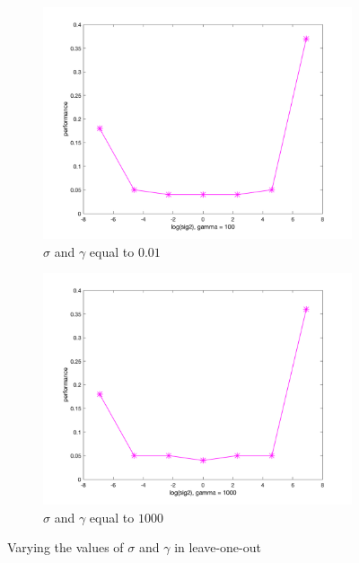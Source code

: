 \documentclass[a4paper, 11pt, one column]{article}
\begin{document}
\begin{figure}[]
\begin{subfigure}{0.33\linewidth}
            \includegraphics[width=\linewidth]{images/loo_sig2_g_100.png}
            \caption{$\sigma$ and $\gamma$ equal to $0.01$}
        \end{subfigure}
        \begin{subfigure}{0.33\linewidth}
            \includegraphics[width=\linewidth]{images/loo_sig2_g_1000.png}
            \caption{$\sigma$ and $\gamma$ equal to $1000$}
        \end{subfigure}
        \caption{Varying the values of $\sigma$ and $\gamma$ in leave-one-out}
        \label{fig:leaveoneval}
\end{figure}
\end{document}
